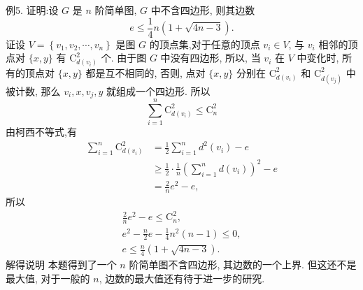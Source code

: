 例5. 证明:设 $G$ 是 $n$ 阶简单图, $G$ 中不含四边形, 则其边数
$$
e \leqslant \frac{1}{4} n(1+\sqrt{4 n-3}) .
$$
证设 $V=\left\{v_1, v_2, \cdots, v_n\right\}$ 是图 $G$ 的顶点集,对于任意的顶点 $v_i \in V$, 与 $v_i$ 相邻的顶点对 $\{x, y\}$ 有 $\mathrm{C}_{d\left(v_i\right)}^2$ 个.
由于图 $G$ 中没有四边形, 所以, 当 $v_i$ 在 $V$ 中变化时, 所有的顶点对 $\{x, y\}$ 都是互不相同的, 否则, 点对 $\{x, y\}$ 分别在 $\mathrm{C}_{d\left(v_i\right)}^2$ 和 $\mathrm{C}_{d\left(v_j\right)}^2$ 中被计数, 那么 $v_i, x, v_j, y$ 就组成一个四边形.
所以
$$
\sum_{i=1}^n \mathrm{C}_{d\left(v_i\right)}^2 \leqslant \mathrm{C}_n^2
$$
由柯西不等式,有
$$
\begin{aligned}
\sum_{i=1}^n \mathrm{C}_{d\left(v_i\right)}^2 & =\frac{1}{2} \sum_{i=1}^n d^2\left(v_i\right)-e \\
& \geqslant \frac{1}{2} \cdot \frac{1}{n}\left(\sum_{i=1}^n d\left(v_i\right)\right)^2-e \\
& =\frac{2}{n} e^2-e,
\end{aligned}
$$
所以
$$
\begin{gathered}
\frac{2}{n} e^2-e \leqslant \mathrm{C}_n^2, \\
e^2-\frac{n}{2} e-\frac{1}{4} n^2(n-1) \leqslant 0, \\
e \leqslant \frac{n}{4}(1+\sqrt{4 n-3}) .
\end{gathered}
$$
解得说明 本题得到了一个 $n$ 阶简单图不含四边形, 其边数的一个上界.
但这还不是最大值, 对于一般的 $n$, 边数的最大值还有待于进一步的研究.



